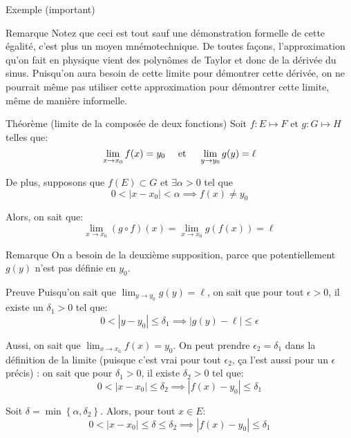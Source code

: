 \documentclass[a4paper]{article}
\begin{document}
\begin{parag}{Exemple (important)}
\begin{subparag}{Remarque}
        Notez que ceci est tout sauf une démonstration formelle de cette égalité, c'est plus un moyen mnémotechnique. De toutes façons, l'approximation qu'on fait en physique vient des polynômes de Taylor et donc de la dérivée du sinus. Puisqu'on aura besoin de cette limite pour démontrer cette dérivée, on ne pourrait même pas utiliser cette approximation pour démontrer cette limite, même de manière informelle.
    \end{subparag}
    
\end{parag}

\begin{parag}{Théorème (limite de la composée de deux fonctions)}
    Soit $f: E \mapsto F$ et $g : G \mapsto H$ telles que:
    \[\lim_{x \to x_0}  f\left(x\right) = y_0 \mathspace \text{ et } \mathspace \lim_{y \to y_0} g\left(y\right) = \ell\]

    De plus, supposons que $f\left(E\right) \subset G$ et $\exists\alpha > 0$ tel que
    \[0 < \left|x - x_0\right| < \alpha \implies f\left(x\right) \neq y_0\]

    Alors, on sait que:
    \[\lim_{x \to x_0} \left(g\circ f\right)\left(x\right) = \lim_{x \to x_0} g\left(f\left(x\right)\right) = \ell\]

    \begin{subparag}{Remarque}
        On a besoin de la deuxième supposition, parce que potentiellement $g\left(y\right)$ n'est pas définie en $y_0$.
    \end{subparag}

    \begin{subparag}{Preuve}
        Puisqu'on sait que $\lim_{y \to y_0} g\left(y\right) = \ell$, on sait que pour tout $\epsilon > 0$, il existe un $\delta_1 > 0$ tel que:
        \[0 < \left|y - y_0\right| \leq \delta_1 \implies \left|g\left(y\right) - \ell\right| \leq \epsilon\]

        Aussi, on sait que $\lim_{x \to x_0} f\left(x\right) = y_0$. On peut prendre $\epsilon_2 = \delta_1$ dans la définition de la limite (puisque c'est vrai pour tout $\epsilon_2$, ça l'est aussi pour un $\epsilon$ précis) : on sait que pour $\delta_1 > 0$, il existe $\delta_2 > 0$ tel que:
        \[0 < \left|x - x_0\right| \leq \delta_2 \implies \left|f\left(x\right) - y_0\right| \leq \delta_1\]

        Soit $\delta = \min\left\{\alpha, \delta_2\right\}$. Alors, pour tout $x \in E$:
        \[0 < \left|x - x_0\right| \leq \delta \leq \delta_2 \implies \left|f\left(x\right) - y_0\right| \leq \delta_1\]


\end{subparag}
\end{parag}
\end{document}

